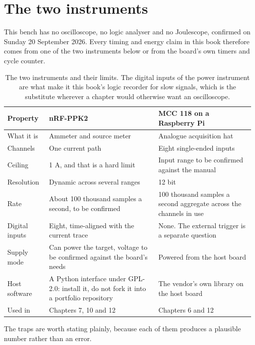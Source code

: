 \section{The two instruments}

This bench has no oscilloscope, no logic analyser and no Joulescope, confirmed on
Sunday 20 September 2026. Every timing and energy claim in this book therefore
comes from one of the two instruments below or from the board's own timers and
cycle counter.

\begin{table}[H]\centering\small
\begin{tabular}{p{44mm}p{58mm}p{48mm}}
\toprule
Property & nRF-PPK2 & MCC 118 on a Raspberry Pi \\
\midrule
What it is & Ammeter and source meter & Analogue acquisition hat \\
Channels & One current path & Eight single-ended inputs \\
Ceiling & 1 A, and that is a hard limit & Input range to be confirmed against the manual \\
Resolution & Dynamic across several ranges & 12 bit \\
Rate & About 100 thousand samples a second, to be confirmed & 100 thousand samples a second aggregate across the channels in use \\
Digital inputs & Eight, time-aligned with the current trace & None. The external trigger is a separate question \\
Supply mode & Can power the target, voltage to be confirmed against the board's needs & Powered from the host board \\
Host software & A Python interface under GPL-2.0: install it, do not fork it into a portfolio repository & The vendor's own library on the host board \\
Used in & Chapters 7, 10 and 12 & Chapters 6 and 12 \\
\bottomrule
\end{tabular}
\caption{The two instruments and their limits. The digital inputs of the power instrument are what make it this book's logic recorder for slow signals, which is the substitute wherever a chapter would otherwise want an oscilloscope.}
\end{table}

The traps are worth stating plainly, because each of them produces a plausible
number rather than an error.

